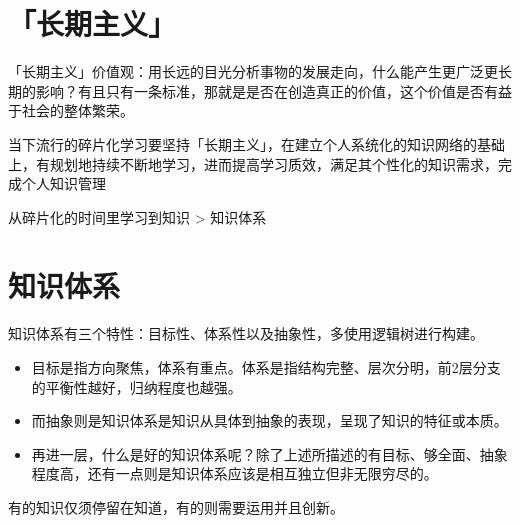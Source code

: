 \documentclass[letterpaper,10pt,english]{sphinxmanual}
\begin{document}
\section{「长期主义」}
\label{\detokenize{index:id3}}
「长期主义」价值观：用长远的目光分析事物的发展走向，什么能产生更广泛更长期的影响？有且只有一条标准，那就是是否在创造真正的价值，这个价值是否有益于社会的整体繁荣。
%
\begin{footnote}[10]\sphinxAtStartFootnote
{}
%
\end{footnote}

当下流行的碎片化学习要坚持「长期主义」，在建立个人系统化的知识网络的基础上，有规划地持续不断地学习，进而提高学习质效，满足其个性化的知识需求，完成个人知识管理

从碎片化的时间里学习到知识 \sphinxhyphen{}>
知识体系%
\begin{footnote}[11]\sphinxAtStartFootnote
{}
%
\end{footnote}


\section{知识体系}
\label{\detokenize{index:id4}}
知识体系有三个特性：目标性、体系性以及抽象性，多使用逻辑树进行构建。%
\begin{footnote}[12]\sphinxAtStartFootnote
{}
%
\end{footnote}
\begin{itemize}
\item {} 
目标是指方向聚焦，体系有重点。体系是指结构完整、层次分明，前2层分支的平衡性越好，归纳程度也越强。

\item {} 
而抽象则是知识体系是知识从具体到抽象的表现，呈现了知识的特征或本质。

\item {} 
再进一层，什么是好的知识体系呢？除了上述所描述的有目标、够全面、抽象程度高，还有一点则是知识体系应该是相互独立但非无限穷尽的。

\end{itemize}

有的知识仅须停留在知道，有的则需要运用并且创新。
\end{document}
